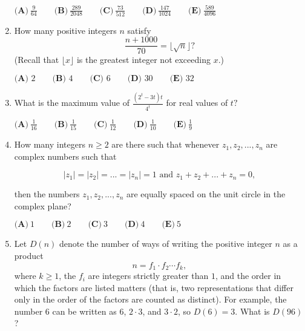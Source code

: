 \documentclass{article}
\begin{document}
\begin{enumerate}[label=\arabic*., itemsep=0.5em]
\(\textbf{(A)}\ \frac{9}{64} \qquad\textbf{(B)}\ \frac{289}{2048} \qquad\textbf{(C)}\  \frac{73}{512} \qquad\textbf{(D)}\ \frac{147}{1024} \qquad\textbf{(E)}\ \frac{589}{4096}\)\par \vspace{0.5em}\item How many positive integers \(n\) satisfy
\begin{equation*}
\frac{n+1000}{70} = \lfloor \sqrt{n} \rfloor?
\end{equation*}
(Recall that \(\lfloor x\rfloor\) is the greatest integer not exceeding \(x\).)

\(\textbf{(A) } 2 \qquad\textbf{(B) } 4 \qquad\textbf{(C) } 6 \qquad\textbf{(D) } 30 \qquad\textbf{(E) } 32\)\par \vspace{0.5em}\item What is the maximum value of \(\frac{(2^t-3t)t}{4^t}\) for real values of \(t?\)

\(\textbf{(A)}\ \frac{1}{16} \qquad\textbf{(B)}\ \frac{1}{15} \qquad\textbf{(C)}\ \frac{1}{12} \qquad\textbf{(D)}\ \frac{1}{10} \qquad\textbf{(E)}\ \frac{1}{9}\)\par \vspace{0.5em}\item How many integers \(n \geq 2\) are there such that whenever \(z_1, z_2, ..., z_n\) are complex numbers such that


\begin{equation*}
|z_1| = |z_2| = ... = |z_n| = 1 \text{    and    } z_1 + z_2 + ... + z_n = 0,
\end{equation*}

then the numbers \(z_1, z_2, ..., z_n\) are equally spaced on the unit circle in the complex plane?

\(\textbf{(A)}\ 1 \qquad\textbf{(B)}\ 2 \qquad\textbf{(C)}\ 3 \qquad\textbf{(D)}\ 4 \qquad\textbf{(E)}\ 5\)\par \vspace{0.5em}\item Let \(D(n)\) denote the number of ways of writing the positive integer \(n\) as a product
\begin{equation*}
n = f_1\cdot f_2\cdots f_k,
\end{equation*}
where \(k\ge1\), the \(f_i\) are integers strictly greater than \(1\), and the order in which the factors are listed matters (that is, two representations that differ only in the order of the factors are counted as distinct). For example, the number \(6\) can be written as \(6\), \(2\cdot 3\), and \(3\cdot2\), so \(D(6) = 3\). What is \(D(96)\)?


\end{enumerate}
\end{document}
